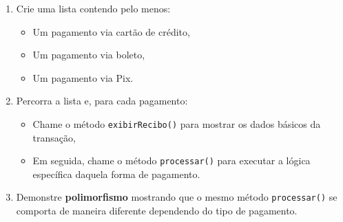 \documentclass{article}
\begin{document}
\begin{enumerate}
\begin{enumerate}
              \item \textbf{\texttt{Pix}}:
                    \begin{itemize}
                        \item Não precisa de atributos adicionais.
                        \item O método \texttt{processar()} deve apenas confirmar o pagamento instantâneo, exibindo a mensagem de sucesso.
                    \end{itemize}
          \end{enumerate}

    \item Crie uma lista contendo pelo menos:
          \begin{itemize}
              \item Um pagamento via cartão de crédito,
              \item Um pagamento via boleto,
              \item Um pagamento via Pix.
          \end{itemize}

    \item Percorra a lista e, para cada pagamento:
          \begin{itemize}
              \item Chame o método \texttt{exibirRecibo()} para mostrar os dados básicos da transação,
              \item Em seguida, chame o método \texttt{processar()} para executar a lógica específica daquela forma de pagamento.
          \end{itemize}

    \item Demonstre \textbf{polimorfismo} mostrando que o mesmo método \texttt{processar()} se comporta de maneira diferente dependendo do tipo de pagamento.
\end{enumerate}
\end{document}
